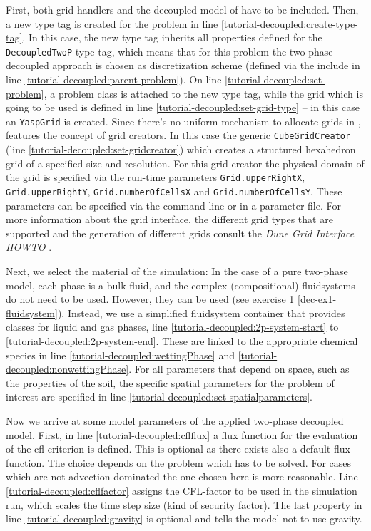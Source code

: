 First, both \Dune  grid handlers and the decoupled model of \Dumux 
have to be included. Then, a new type tag is created for the problem 
in line \ref{tutorial-decoupled:create-type-tag}.  In this case, the 
new type tag inherits all properties defined for the \texttt{DecoupledTwoP} 
type tag, which means that for this problem the two-phase decoupled approach
is chosen as discretization scheme (defined via the include in line 
\ref{tutorial-decoupled:parent-problem}). On line \ref{tutorial-decoupled:set-problem}, 
a problem class is attached to the new type tag, while the grid which
is going to be used is defined in line \ref{tutorial-decoupled:set-grid-type} --
in this case an \texttt{YaspGrid} is created. Since there's no uniform mechanism to
allocate grids in \Dune, \Dumux features the concept of grid creators.
In this case the generic \texttt{CubeGridCreator} (line \ref{tutorial-decoupled:set-gridcreator}) which creates a
structured hexahedron grid of a specified size and resolution. For
this grid creator the  physical domain of the grid is specified via the
run-time parameters \texttt{Grid.upperRightX},
\texttt{Grid.upperRightY}, \texttt{Grid.numberOfCellsX} and
\texttt{Grid.numberOfCellsY}. These parameters can be specified via
the command-line or in a parameter file.
For more information about the \Dune grid interface, the different grid types 
that are supported and the generation of different grids consult 
the \textit{Dune Grid Interface HOWTO} \cite{DUNE-HP}. 

Next, we select the material of the simulation: In the case of a pure two-phase
model, each phase is a bulk fluid, and the complex (compositional) fluidsystems
do not need to be used. However, they can be used (see exercise 1 \ref{dec-ex1-fluidsystem}). 
Instead, we use a simplified fluidsystem container that provides classes 
for liquid and gas phases, line \ref{tutorial-decoupled:2p-system-start} to 
\ref{tutorial-decoupled:2p-system-end}. These are linked to the appropriate 
chemical species in line \ref{tutorial-decoupled:wettingPhase} and 
\ref{tutorial-decoupled:nonwettingPhase}. For all parameters that depend 
on space, such as the properties of the soil, the specific spatial parameters 
for the problem of interest are specified in line
\ref{tutorial-decoupled:set-spatialparameters}. 

Now we arrive at some model parameters of the applied two-phase decoupled 
model. First, in line  \ref{tutorial-decoupled:cflflux} a flux function for the evaluation of the cfl-criterion is defined. This is optional as there exists also a default flux function. The choice depends on the problem which has to be solved. For cases which are not advection dominated the one chosen here is more reasonable.
Line \ref{tutorial-decoupled:cflfactor} assigns the CFL-factor to be used in the
simulation run, which scales the time step size (kind of security factor). The last property in line \ref{tutorial-decoupled:gravity} 
is optional and tells the model not to use gravity.

